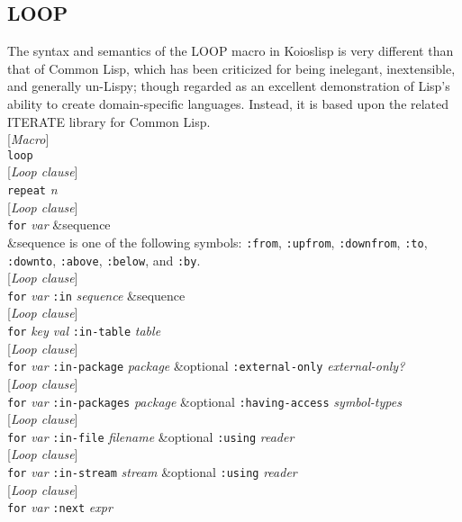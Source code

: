 \documentclass[10pt]{book}
\newenvironment{defother}[2]{[\textit{#1}]\\\texttt{#2}}{\\}
\newenvironment{defmacro}[1]{\begin{defother}{Macro}{#1}}{\end{defother}}
\begin{document}
\subsection{LOOP}
The syntax and semantics of the LOOP macro in Koioslisp is very different than that of Common Lisp, which has been criticized for being inelegant, inextensible, and generally un-Lispy; though regarded as an excellent demonstration of Lisp's ability to create domain-specific languages. Instead, it is based upon the related ITERATE library for Common Lisp.\\
\begin{defmacro}{loop}\end{defmacro}
\begin{defother}{Loop clause}{repeat} \textit{n} \end{defother}
\begin{defother}{Loop clause}{for} \textit{var} \&sequence\\
\&sequence is one of the following symbols: \texttt{:from}, \texttt{:upfrom}, \texttt{:downfrom}, \texttt{:to}, \texttt{:downto}, \texttt{:above}, \texttt{:below}, and \texttt{:by}.\end{defother}
\begin{defother}{Loop clause}{for} \textit{var} \texttt{:in} \textit{sequence} \&sequence\end{defother}
\begin{defother}{Loop clause}{for} \textit{key val} \texttt{:in-table} \textit{table} \end{defother}
\begin{defother}{Loop clause}{for} \textit{var} \texttt{:in-package} \textit{package} \&optional \texttt{:external-only} \textit{external-only?}\end{defother}
\begin{defother}{Loop clause}{for} \textit{var} \texttt{:in-packages} \textit{package} \&optional \texttt{:having-access} \textit{symbol-types}\end{defother}
\begin{defother}{Loop clause}{for} \textit{var} \texttt{:in-file} \textit{filename} \&optional \texttt{:using} \textit{reader}\end{defother}
\begin{defother}{Loop clause}{for} \textit{var} \texttt{:in-stream} \textit{stream} \&optional \texttt{:using} \textit{reader}\end{defother}
\begin{defother}{Loop clause}{for} \textit{var} \texttt{:next} \textit{expr}\end{defother}
\end{document}
